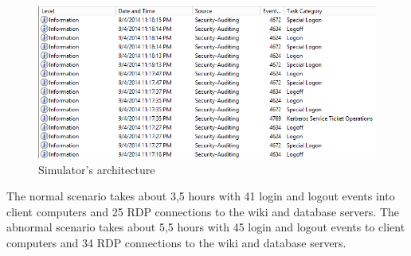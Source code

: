  	

\begin{figure}[ht!]
\centering
\includegraphics[width=\textwidth]{active_directory_logs_result_2.png}
\caption{Simulator's architecture}
\label{overflow}
\end{figure}

The normal scenario takes about 3,5 hours with 41 login and logout events into client computers and 25 RDP connections to the wiki and database servers. The abnormal scenario takes about 5,5 hours with 45 login and logout events to client computers and 34 RDP connections to the wiki and database servers. 


 
% 